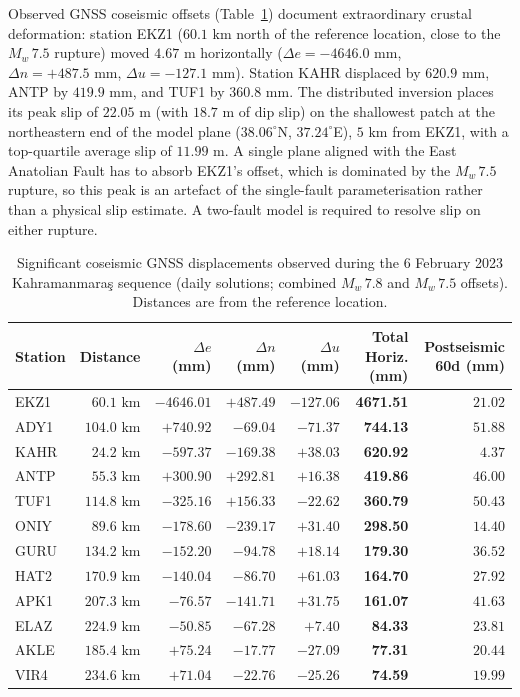 \documentclass[11pt,a4paper]{article}
\begin{document}
Observed GNSS coseismic offsets (Table~\ref{tab:kahraman_gnss}) document extraordinary crustal deformation: station EKZ1 ($60.1\text{ km}$ north of the reference location, close to the $M_w\,7.5$ rupture) moved \textbf{$4.67\text{ m}$} horizontally ($\Delta e = -4646.0\text{ mm}$, $\Delta n = +487.5\text{ mm}$, $\Delta u = -127.1\text{ mm}$). Station KAHR displaced by $620.9\text{ mm}$, ANTP by $419.9\text{ mm}$, and TUF1 by $360.8\text{ mm}$. The distributed inversion places its peak slip of $22.05\text{ m}$ (with $18.7\text{ m}$ of dip slip) on the shallowest patch at the northeastern end of the model plane ($38.06^\circ$N, $37.24^\circ$E), $5\text{ km}$ from EKZ1, with a top-quartile average slip of $11.99\text{ m}$. A single plane aligned with the East Anatolian Fault has to absorb EKZ1's offset, which is dominated by the $M_w\,7.5$ rupture, so this peak is an artefact of the single-fault parameterisation rather than a physical slip estimate. A two-fault model is required to resolve slip on either rupture.

\begin{table}[htbp]
\centering
\caption{Significant coseismic GNSS displacements observed during the 6 February 2023 Kahramanmara\c{s} sequence (daily solutions; combined $M_w\,7.8$ and $M_w\,7.5$ offsets). Distances are from the reference location.}
\label{tab:kahraman_gnss}
\small
\begin{tabular}{lrrrrrr}
\toprule
Station & Distance & $\Delta e$ (mm) & $\Delta n$ (mm) & $\Delta u$ (mm) & Total Horiz. (mm) & Postseismic 60d (mm) \\
\midrule
EKZ1 & $60.1\text{ km}$ & $-4646.01$ & $+487.49$ & $-127.06$ & \textbf{4671.51} & $21.02$ \\
ADY1 & $104.0\text{ km}$ & $+740.92$ & $-69.04$ & $-71.37$ & \textbf{744.13} & $51.88$ \\
KAHR & $24.2\text{ km}$ & $-597.37$ & $-169.38$ & $+38.03$ & \textbf{620.92} & $4.37$ \\
ANTP & $55.3\text{ km}$ & $+300.90$ & $+292.81$ & $+16.38$ & \textbf{419.86} & $46.00$ \\
TUF1 & $114.8\text{ km}$ & $-325.16$ & $+156.33$ & $-22.62$ & \textbf{360.79} & $50.43$ \\
ONIY & $89.6\text{ km}$ & $-178.60$ & $-239.17$ & $+31.40$ & \textbf{298.50} & $14.40$ \\
GURU & $134.2\text{ km}$ & $-152.20$ & $-94.78$ & $+18.14$ & \textbf{179.30} & $36.52$ \\
HAT2 & $170.9\text{ km}$ & $-140.04$ & $-86.70$ & $+61.03$ & \textbf{164.70} & $27.92$ \\
APK1 & $207.3\text{ km}$ & $-76.57$ & $-141.71$ & $+31.75$ & \textbf{161.07} & $41.63$ \\
ELAZ & $224.9\text{ km}$ & $-50.85$ & $-67.28$ & $+7.40$ & \textbf{84.33} & $23.81$ \\
AKLE & $185.4\text{ km}$ & $+75.24$ & $-17.77$ & $-27.09$ & \textbf{77.31} & $20.44$ \\
VIR4 & $234.6\text{ km}$ & $+71.04$ & $-22.76$ & $-25.26$ & \textbf{74.59} & $19.99$ \\
\bottomrule
\end{tabular}
\end{table}
\end{document}
